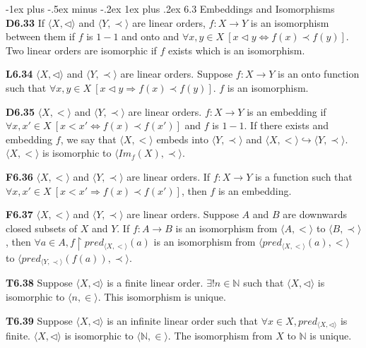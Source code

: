 \documentclass[10pt, landscape]{article}
\makeatletter
\renewcommand{\subsection}{\@startsection{subsection}{3}{0mm}%
                                {-1ex plus -.5ex minus -.2ex}%
                                {1ex plus .2ex}%
                                {\normalfont\small\bfseries}}%
\makeatother
\begin{document}
\begin{multicols*}{3}
\subsection{6.3 Embeddings and Isomorphisms}
\textbf{D6.33} If $\langle X, \lhd \rangle$ and $\langle Y, \prec \rangle$ are linear orders, $f: X \rightarrow Y$ is an isomorphism between them if $f$ is $1-1$ and onto and $\forall x, y \in X \ [x \lhd y \Leftrightarrow f(x) \prec f(y)]$. Two linear orders are isomorphic if $f$ exists which is an isomorphism.

\textbf{L6.34} $\langle X, \lhd \rangle$ and $\langle Y, \prec \rangle$ are linear orders. Suppose $f:X \rightarrow Y$ is an onto function such that $\forall x, y \in X \ [x \lhd y \Rightarrow f(x) \prec f(y)]$. $f$ is an isomorphism.

\textbf{D6.35} $\langle X, < \rangle$ and $\langle Y, \prec \rangle$ are linear orders. $f:X\rightarrow Y$ is an embedding if $\forall x, x' \in X \ [x < x' \Leftrightarrow f(x) \prec f(x')]$ and $f$ is $1-1$.  If there exists and embedding $f$, we say that $\langle X, < \rangle$ embeds into $\langle Y, \prec \rangle$ and $\langle X, <\rangle \hookrightarrow \langle Y, \prec \rangle$. $\langle X, < \rangle$ is isomorphic to $\langle Im_f(X), \prec \rangle$.

\textbf{F6.36} $\langle X, < \rangle$ and $\langle Y, \prec \rangle$ are linear orders. If $f: X \rightarrow Y$ is a function such that $\forall x, x' \in X \ [x < x' \Rightarrow f(x) \prec f(x')]$, then $f$ is an embedding.

\textbf{F6.37} $\langle X, < \rangle$ and $\langle Y, \prec \rangle$ are linear orders. Suppose $A$ and $B$ are downwards closed subsets of $X$ and $Y$. If $f: A \rightarrow B$ is an isomorphism from $\langle A, < \rangle$ to $\langle B, \prec \rangle$, then $\forall a \in A, f\restriction pred_{\langle X, < \rangle}(a)$ is an isomorphism from $\langle pred_{\langle X, < \rangle}(a), < \rangle$ to $\langle pred_{\langle Y, \prec \rangle}(f(a)), \prec \rangle$.

\textbf{T6.38} Suppose $\langle X, \lhd \rangle $ is a finite linear order. $\exists! n \in \mathbb{N}$ such that $\langle X, \lhd \rangle $ is isomorphic to $\langle n, \in \rangle$. This isomorphism is unique.

\textbf{T6.39} Suppose $\langle X, \lhd \rangle$ is an infinite linear order such that $\forall x \in X, pred_{\langle X, \lhd \rangle}$ is finite. $\langle X, \lhd \rangle$ is isomorphic to $\langle \mathbb{N}, \in \rangle$. The isomorphism from $X$ to $\mathbb{N}$ is unique.


\end{multicols*}
\end{document}
